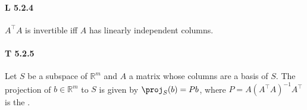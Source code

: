 \paragraph{L 5.2.4} $A^\top A$ is invertible iff $A$ has
linearly independent columns.

\paragraph{T 5.2.5} Let $S$ be a subspace of $\mathbb{R}^m$ and $A$ a
matrix whose columns are a basis of $S$. The projection of
$b\in\mathbb{R}^m$ to $S$ is given by $\proj_S(b)=Pb$, where $P=A(A^\top
A)^{-1}A^\top$ is the .
